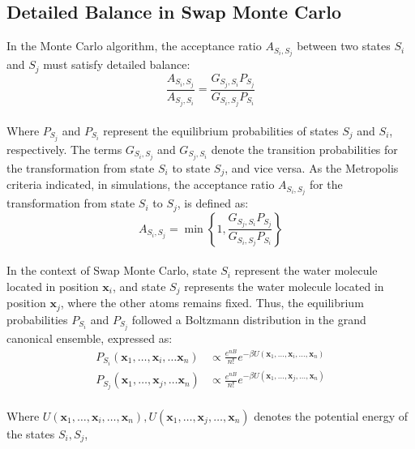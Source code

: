 \documentclass[journal=jacsat,manuscript=article]{achemso}
\begin{document}
\subsection{Detailed Balance in Swap Monte Carlo}
In the Monte Carlo algorithm, the acceptance ratio $A_{S_i, S_j}$ between two states $S_i$ and $S_j$ must satisfy detailed balance:
\begin{equation}\label{eq:acceptance_ratio}
\frac{A_{S_i,S_j}}{A_{S_j,S_i}}=\frac{G_{S_j,S_i} P_{S_j}}{G_{S_i,S_j} P_{S_i}}
\end{equation} \\
\noindent Where $P_{S_j}$ and $P_{S_i}$ represent the equilibrium probabilities of states $S_j$ and $S_i$, respectively. 
The terms $G_{S_i, S_j}$ and $G_{S_j, S_i}$ denote the transition probabilities for the transformation from state $S_i$ to state $S_j$, and vice versa.
As the Metropolis criteria indicated, in simulations, the acceptance ratio $A_{S_i,S_j}$ for the transformation from state $S_i$ to $S_j$, is defined as:
\begin{equation}\label{eq:metropolis}
A_{S_i,S_j}=\min \left\{1, \frac{G_{S_j,S_i} P_{S_j}}{G_{S_i,S_j} P_{S_i}}\right\}
\end{equation} \\
\newline
In the context of Swap Monte Carlo, state $S_i$ represent the water molecule located in position $\mathbf{x}_i$, and state $S_j$ represents the water molecule located in position $\mathbf{x}_j$, where the other atoms remains fixed.
Thus, the equilibrium probabilities $P_{S_i}$ and $P_{S_j}$ followed a Boltzmann distribution in the grand canonical ensemble, expressed as:
\begin{equation}\label{eq:equilibrium_probability}
  \begin{aligned}
  P_{S_i}\left(\mathbf{x}_1, \ldots, \mathbf{x}_i, \ldots\mathbf{x}_n\right) & \propto \frac{e^{n B}}{n!} e^{-\beta U\left(\mathbf{x}_1, \ldots, \mathbf{x}_i,\ldots, \mathbf{x}_n\right)}  \\
  P_{S_j}\left(\mathbf{x}_1, \ldots, \mathbf{x}_j, \ldots\mathbf{x}_n\right) & \propto \frac{e^{n B}}{n!} e^{-\beta U\left(\mathbf{x}_1, \ldots, \mathbf{x}_j,\ldots, \mathbf{x}_n\right)}
  \end{aligned}
\end{equation}
\\
Where $U\left(\mathbf{x}_1, \ldots, \mathbf{x}_i,\ldots, \mathbf{x}_n\right), U\left(\mathbf{x}_1, \ldots, \mathbf{x}_j,\ldots, \mathbf{x}_n\right)$ denotes the potential energy of the states $S_i, S_j$, 
\end{document}
